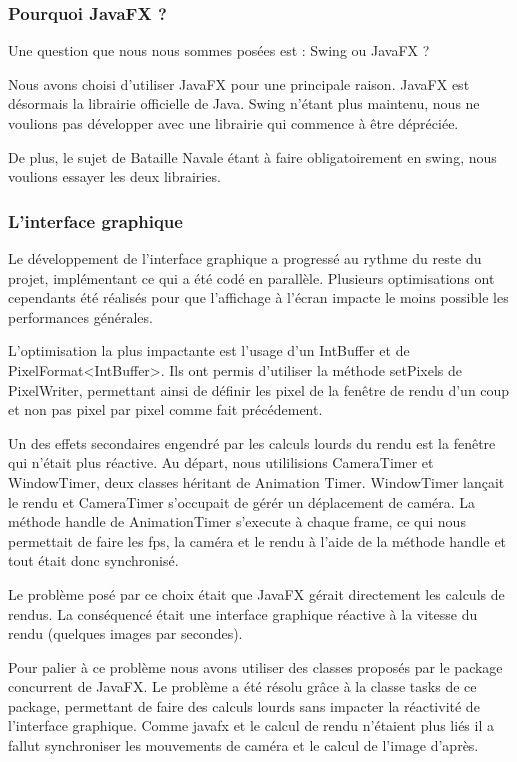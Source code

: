 \subsubsection{Pourquoi JavaFX ?}

Une question que nous nous sommes posées est : Swing ou JavaFX ?

Nous avons choisi d'utiliser JavaFX pour une principale raison. JavaFX est désormais la librairie officielle de Java. Swing n'étant plus maintenu, nous ne voulions pas développer avec une librairie qui commence à être dépréciée.

De plus, le sujet de Bataille Navale étant à faire obligatoirement en swing, nous voulions essayer les deux librairies.


\subsubsection{L'interface graphique}

Le développement de l'interface graphique a progressé au rythme du reste du projet, implémentant ce qui a été codé en parallèle. Plusieurs optimisations ont cependants été réalisés pour que l'affichage à l'écran impacte le moins possible les performances générales.

L'optimisation la plus impactante est l'usage d'un IntBuffer et de PixelFormat<IntBuffer>. Ils ont permis d'utiliser la méthode setPixels de PixelWriter, permettant ainsi de définir les pixel de la fenêtre de rendu d'un coup et non pas pixel par pixel comme fait précédement.

Un des effets secondaires engendré par les calculs lourds du rendu est la fenêtre qui n'était plus réactive.
Au départ, nous utililisions CameraTimer et WindowTimer, deux classes héritant de Animation Timer. WindowTimer lançait le rendu et CameraTimer s'occupait de gérér un déplacement de caméra. La méthode handle de AnimationTimer s'execute à chaque frame, ce qui nous permettait de faire les fps, la caméra et le rendu à l'aide de la méthode handle et tout était donc synchronisé.

Le problème posé par ce choix était que JavaFX gérait directement les calculs de rendus. La conséquencé était une interface graphique réactive à la vitesse du rendu (quelques images par secondes).

Pour palier à ce problème nous avons utiliser des classes proposés par le package concurrent de JavaFX. Le problème a été résolu grâce à la classe tasks de ce package, permettant de faire des calculs lourds sans impacter la réactivité de l'interface graphique. Comme javafx et le calcul de rendu n'étaient plus liés il a fallut synchroniser les mouvements de caméra et le calcul de l'image d'après.

